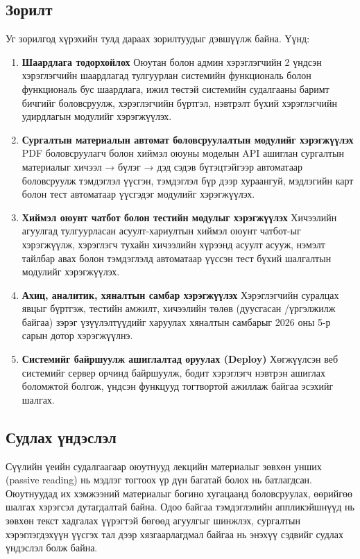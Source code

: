     \subsection*{Зорилт}
        Уг зорилгод хүрэхийн тулд дараах зорилтуудыг дэвшүүлж байна. Үүнд:
        \begin{enumerate}
            \item \textbf{Шаардлага тодорхойлох} \newline 
            Оюутан болон админ хэрэглэгчийн 2 үндсэн хэрэглэгчийн шаардлагад тулгуурлан системийн функциональ болон функциональ бус шаардлага, ижил төстэй системийн судалгааны баримт бичгийг боловсруулж, хэрэглэгчийн бүртгэл, нэвтрэлт бүхий хэрэглэгчийн удирдлагын модулийг хэрэгжүүлэх.
            \item \textbf{Сургалтын материалын автомат боловсруулалтын модулийг хэрэгжүүлэх} \newline 
            PDF боловсруулагч болон хиймэл оюуны моделын API ашиглан сургалтын материалыг хичээл → бүлэг → дэд сэдэв бүтэцтэйгээр автоматаар боловсруулж тэмдэглэл үүсгэн, тэмдэглэл бүр дээр хураангуй, мэдлэгийн карт болон тест  автоматаар үүсгэдэг модулийг хэрэгжүүлэх.
            \item \textbf{Хиймэл оюунт чатбот болон тестийн модулыг хэрэгжүүлэх} \newline 
            Хичээлийн агуулгад тулгуурласан асуулт-хариултын хиймэл оюунт чатбот-ыг хэрэгжүүлж, хэрэглэгч тухайн хичээлийн хүрээнд асуулт асууж, нэмэлт тайлбар авах болон тэмдэглэлд автоматаар үүссэн тест бүхий шалгалтын модулийг хэрэгжүүлэх.
            \item \textbf{Ахиц, аналитик, хяналтын самбар хэрэгжүүлэх} \newline 
            Хэрэглэгчийн суралцах явцыг бүртгэж, тестийн амжилт, хичээлийн төлөв (дуусгасан /үргэлжилж байгаа) зэрэг үзүүлэлтүүдийг харуулах хяналтын самбарыг 2026 оны 5-р сарын дотор хэрэгжүүлнэ.
            \item \textbf{Системийг байршуулж ашиглалтад оруулах (Deploy)} \newline 
            Хөгжүүлсэн веб системийг сервер орчинд байршуулж, бодит хэрэглэгч нэвтрэн ашиглах боломжтой болгож, үндсэн функцууд тогтвортой ажиллаж байгаа эсэхийг шалгах.
        \end{enumerate}

    \subsection*{Судлах үндэслэл}
        Сүүлийн үеийн судалгаагаар оюутнууд лекцийн материалыг зөвхөн унших (passive reading) нь мэдлэг тогтоох үр дүн багатай болох нь батлагдсан. Оюутнуудад их хэмжээний материалыг богино хугацаанд боловсруулах, өөрийгөө шалгах хэрэгсэл дутагдалтай байна. Одоо байгаа тэмдэглэлийн аппликэйшнүүд нь зөвхөн текст хадгалах үүрэгтэй бөгөөд агуулгыг шинжлэх, сургалтын хэрэглэгдэхүүн үүсгэх тал дээр хязгаарлагдмал байгаа нь энэхүү сэдвийг судлах үндэслэл болж байна.
        

